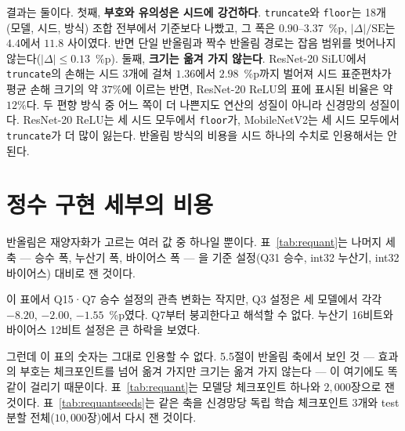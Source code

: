 \documentclass[11pt,a4paper,oneside]{report}
\newcommand{\fittable}[1]{\adjustbox{max width=\textwidth}{#1}}
\begin{document}
결과는 둘이다. 첫째, \textbf{부호와 유의성은 시드에 강건하다}. \texttt{truncate}와 \texttt{floor}는 18개
(모델, 시드, 방식) 조합 전부에서 기준보다 나빴고, 그 폭은 $0.90$--$3.37$~\%p,
$|\Delta|/\mathrm{SE}$는 $4.4$에서 $11.8$ 사이였다. 반면 단일 반올림과 짝수 반올림 경로는 잡음 범위를
벗어나지 않는다($|\Delta| \leq 0.13$~\%p). 둘째, \textbf{크기는 옮겨 가지 않는다}. ResNet-20 SiLU에서
\texttt{truncate}의 손해는 시드 3개에 걸쳐 $1.36$에서 $2.98$~\%p까지 벌어져 시드 표준편차가 평균 손해 크기의
약 $37\%$에 이르는 반면, ResNet-20 ReLU의 표에 표시된 비율은 약 $12\%$다. 두 편향 방식 중 어느 쪽이 더
나쁜지도 연산의 성질이 아니라 신경망의 성질이다. ResNet-20 ReLU는 세 시드 모두에서 \texttt{floor}가,
MobileNetV2는 세 시드 모두에서 \texttt{truncate}가 더 많이 잃는다. 반올림 방식의 비용을 시드 하나의 수치로
인용해서는 안 된다.

\section{정수 구현 세부의 비용}

반올림은 재양자화가 고르는 여러 값 중 하나일 뿐이다. 표~\ref{tab:requant}는 나머지 세 축 --- 승수 폭,
누산기 폭, 바이어스 폭 --- 을 기준 설정(Q31 승수, int32 누산기, int32 바이어스) 대비로 잰 것이다.

\begin{table}[!t]
\caption[재양자화 구현 세부의 비용]{재양자화 구현 세부의 정확도 비용. 기준 설정 대비 정수 top-1 변화(\%p), 이미지 $2{,}000$장,
\texttt{npu-default} 스킴. 설정 이름의 \texttt{m}은 승수 비트, \texttt{acc}는 누산기 비트, \texttt{b}는
바이어스 비트다.}
\label{tab:requant}
\centering
\small
\fittable{}
\end{table}

이 표에서 Q15·Q7 승수 설정의 관측 변화는 작지만, Q3 설정은 세 모델에서 각각
$-8.20$, $-2.00$, $-1.55$~\%p였다. Q7부터 붕괴한다고 해석할 수 없다.
누산기 16비트와 바이어스 12비트 설정은 큰 하락을 보였다.

그런데 이 표의 숫자는 그대로 인용할 수 없다. 5.5절이 반올림 축에서 보인 것 --- 효과의 부호는 체크포인트를
넘어 옮겨 가지만 크기는 옮겨 가지 않는다 --- 이 여기에도 똑같이 걸리기 때문이다. 표~\ref{tab:requant}는
모델당 체크포인트 하나와 $2{,}000$장으로 잰 것이다. 표~\ref{tab:requantseeds}는 같은 축을 신경망당 독립
학습 체크포인트 3개와 test 분할 전체($10{,}000$장)에서 다시 잰 것이다.

\begin{table}[!t]
\caption[재양자화 축, 시드 3개]{재양자화 구현 세부의 정확도 비용을 신경망당 체크포인트 3개로 다시 잰 것.
기준 설정 대비 정수 top-1 변화의 시드 평균 $\pm$ 시드 간 표준편차(\%p), test 분할 전체 $10{,}000$장,
\texttt{npu-default} 스킴. $\pm$ 뒤의 값은 쌍 표준오차가 아니라 \emph{시드 간} 표준편차다.}
\label{tab:requantseeds}
\centering
\small
\fittable{}
\end{table}
\end{document}
